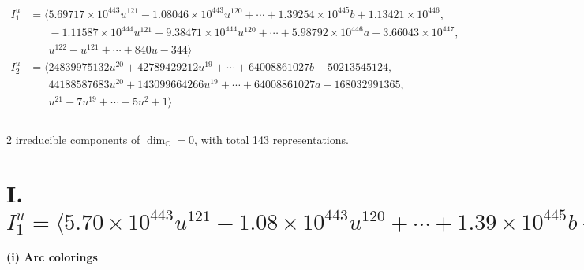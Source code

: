 \documentclass[1p]{elsarticle_modified}
\theoremstyle{definition}
\begin{document}
\begin{align*}
I^u_{1}&=\langle 
5.69717\times10^{443} u^{121}-1.08046\times10^{443} u^{120}+\cdots+1.39254\times10^{445} b+1.13421\times10^{446},\\
\phantom{I^u_{1}}&\phantom{= \langle  }-1.11587\times10^{444} u^{121}+9.38471\times10^{444} u^{120}+\cdots+5.98792\times10^{446} a+3.66043\times10^{447},\\
\phantom{I^u_{1}}&\phantom{= \langle  }u^{122}- u^{121}+\cdots+840 u-344\rangle \\
I^u_{2}&=\langle 
24839975132 u^{20}+42789429212 u^{19}+\cdots+64008861027 b-50213545124,\\
\phantom{I^u_{2}}&\phantom{= \langle  }44188587683 u^{20}+143099664266 u^{19}+\cdots+64008861027 a-168032991365,\\
\phantom{I^u_{2}}&\phantom{= \langle  }u^{21}-7 u^{19}+\cdots-5 u^2+1\rangle \\
\\
\end{align*}
\raggedright * 2 irreducible components of $\dim_{\mathbb{C}}=0$, with total 143 representations.\\
\newpage
\renewcommand{\arraystretch}{1}
\centering \section*{I. $I^u_{1}= \langle 5.70\times10^{443} u^{121}-1.08\times10^{443} u^{120}+\cdots+1.39\times10^{445} b+1.13\times10^{446},\;-1.12\times10^{444} u^{121}+9.38\times10^{444} u^{120}+\cdots+5.99\times10^{446} a+3.66\times10^{447},\;u^{122}- u^{121}+\cdots+840 u-344 \rangle$}
\flushleft \textbf{(i) Arc colorings}\\
\end{document}
